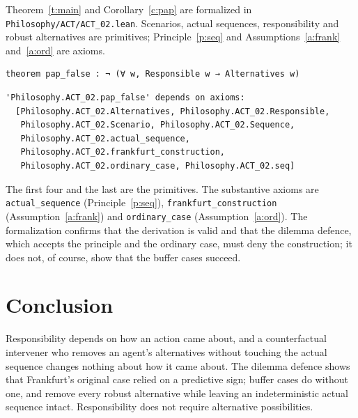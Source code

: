 \documentclass{situationist-preprint}
\begin{document}
Theorem~\ref{t:main} and Corollary~\ref{c:pap} are formalized in \nolinkurl{Philosophy/ACT/ACT_02.lean}. Scenarios, actual sequences, responsibility and robust alternatives are primitives; Principle~\ref{p:seq} and Assumptions~\ref{a:frank} and~\ref{a:ord} are axioms.

\begin{lstlisting}
theorem pap_false : ¬ (∀ w, Responsible w → Alternatives w)
\end{lstlisting}

\begin{lstlisting}
'Philosophy.ACT_02.pap_false' depends on axioms:
  [Philosophy.ACT_02.Alternatives, Philosophy.ACT_02.Responsible,
   Philosophy.ACT_02.Scenario, Philosophy.ACT_02.Sequence,
   Philosophy.ACT_02.actual_sequence,
   Philosophy.ACT_02.frankfurt_construction,
   Philosophy.ACT_02.ordinary_case, Philosophy.ACT_02.seq]
\end{lstlisting}

The first four and the last are the primitives. The substantive axioms are \texttt{actual\_sequence} (Principle~\ref{p:seq}), \texttt{frankfurt\_construction} (Assumption~\ref{a:frank}) and \texttt{ordinary\_case} (Assumption~\ref{a:ord}). The formalization confirms that the derivation is valid and that the dilemma defence, which accepts the principle and the ordinary case, must deny the construction; it does not, of course, show that the buffer cases succeed.

\section{Conclusion}

Responsibility depends on how an action came about, and a counterfactual intervener who removes an agent's alternatives without touching the actual sequence changes nothing about how it came about. The dilemma defence shows that Frankfurt's original case relied on a predictive sign; buffer cases do without one, and remove every robust alternative while leaving an indeterministic actual sequence intact. Responsibility does not require alternative possibilities.
\end{document}
